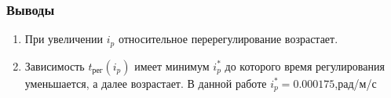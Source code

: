 \begin{enumerate}
                            
                \end{enumerate}
                \subsubsection{Выводы}
                \begin{enumerate}
                    \item При увеличении $i_p$ относительное перерегулирование  возрастает.
                    \item Зависимость $t_{\text{рег}}(i_p)$ имеет минимум $i^*_p$  до которого время регулирования уменьшается, а далее возрастает. В данной работе $i^*_p=0.000175$,рад/м/с 
                \end{enumerate}
                
                \newpage
